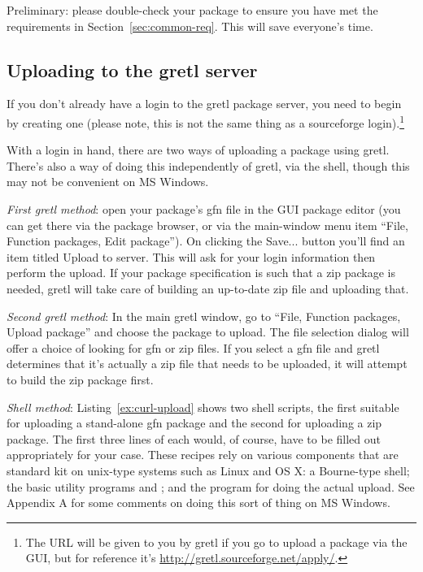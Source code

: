 \documentclass[oneside]{book}
\begin{document}
Preliminary: please double-check your package to ensure you have met
the requirements in Section~\ref{sec:common-req}. This will save
everyone's time.

\subsection{Uploading to the gretl server}

If you don't already have a login to the gretl package server, you
need to begin by creating one (please note, this is not the same thing
as a sourceforge login).\footnote{The URL will be given to you by
  gretl if you go to upload a package via the GUI, but for reference
  it's \url{http://gretl.sourceforge.net/apply/}.}

With a login in hand, there are two ways of uploading a package using
gretl. There's also a way of doing this independently of gretl, via
the shell, though this may not be convenient on MS Windows.

\textit{First gretl method}: open your package's \textsf{gfn} file in
the GUI package editor (you can get there via the package browser, or
via the main-window menu item ``File, Function packages, Edit
package'').  On clicking the \textsf{Save...} button you'll find an
item titled \textsf{Upload to server}. This will ask for your login
information then perform the upload. If your package specification is
such that a zip package is needed, gretl will take care of building an
up-to-date zip file and uploading that.

\textit{Second gretl method}: In the main gretl window, go to ``File,
Function packages, Upload package'' and choose the package to
upload. The file selection dialog will offer a choice of looking for
\textsf{gfn} or \textsf{zip} files. If you select a gfn file
and gretl determines that it's actually a zip file that needs
to be uploaded, it will attempt to build the zip package first.

\textit{Shell method}: Listing~\ref{ex:curl-upload} shows two shell
scripts, the first suitable for uploading a stand-alone gfn package
and the second for uploading a zip package. The first three lines of
each would, of course, have to be filled out appropriately for your
case.  These recipes rely on various components that are standard kit
on unix-type systems such as Linux and OS X: a Bourne-type shell; the
basic utility programs  and ; and the
 program for doing the actual upload. See Appendix A for
some comments on doing this sort of thing on MS Windows.
\end{document}
